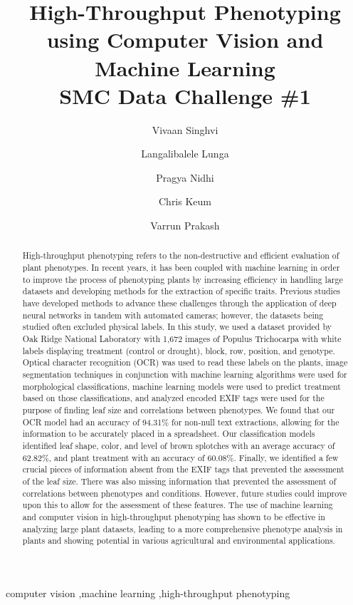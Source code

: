 \documentclass[final,5p,times,twocolumn,authoryear]{elsarticle}
\begin{document}
\begin{frontmatter}

\title{
High-Throughput Phenotyping using Computer Vision and Machine Learning \\
\large SMC Data Challenge \#1
}

\author[]{Vivaan Singhvi}
\author[]{Langalibalele Lunga}
\author[]{Pragya Nidhi}
\author[]{Chris Keum}
\author[]{Varrun Prakash}

\begin{abstract}
High-throughput phenotyping refers to the non-destructive and efficient evaluation of plant phenotypes. In recent years, it has been coupled with machine learning in order to improve the process of phenotyping plants by increasing efficiency in handling large datasets and developing methods for the extraction of specific traits. Previous studies have developed methods to advance these challenges through the application of deep neural networks in tandem with automated cameras; however, the datasets being studied often excluded physical labels. In this study, we used a dataset provided by Oak Ridge National Laboratory with 1,672 images of Populus Trichocarpa with white labels displaying treatment (control or drought), block, row, position, and genotype. Optical character recognition (OCR) was used to read these labels on the plants, image segmentation techniques in conjunction with machine learning algorithms were used for morphological classifications, machine learning models were used to predict treatment based on those classifications, and analyzed encoded EXIF tags were used for the purpose of finding leaf size and correlations between phenotypes. We found that our OCR model had an accuracy of 94.31\% for non-null text extractions, allowing for the information to be accurately placed in a spreadsheet. Our classification models identified leaf shape, color, and level of brown splotches with an average accuracy of 62.82\%, and plant treatment with an accuracy of 60.08\%. Finally, we identified a few crucial pieces of information absent from the EXIF tags that prevented the assessment of the leaf size. There was also missing information that prevented the assessment of correlations between phenotypes and conditions. However, future studies could improve upon this to allow for the assessment of these features. The use of machine learning and computer vision in high-throughput phenotyping has shown to be effective in analyzing large plant datasets, leading to a more comprehensive phenotype analysis in plants and showing potential in various agricultural and environmental applications.
\end{abstract}

\begin{keyword}
computer vision \sep machine learning \sep high-throughput phenotyping
\end{keyword}

\end{frontmatter}
\end{document}
